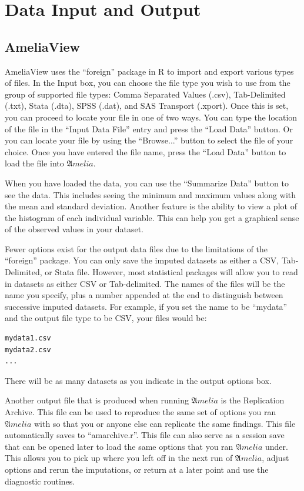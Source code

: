 \documentclass[12pt,titlepage]{article}
\begin{document}
\section{Data Input and Output}
\label{sec:data}


\subsection{AmeliaView}
\label{sec:data-gui}
AmeliaView uses the ``foreign'' package in R to import and export various types of files.  In the Input box, you can choose the file type you wish to use from the group of supported file types: Comma Separated Values (.csv), Tab-Delimited (.txt), Stata (.dta), SPSS (.dat), and SAS Transport (.xport). Once this is set, you can proceed to locate your file in one of two ways.  You can type the location of the file in the ``Input Data File'' entry and press the ``Load Data'' button.  Or you can locate your file by using the ``Browse...'' button to select the file of your choice.  Once you have entered the file name, press the ``Load Data'' button to load the file into ${\mathfrak Amelia}$.  

When you have loaded the data, you can use the ``Summarize Data'' button to see the data.  This includes seeing the minimum and maximum values along with the mean and standard deviation.  Another feature is the ability to view a plot of the histogram of each individual variable.  This can help you get a graphical sense of the observed values in your dataset.

Fewer options exist for the output data files due to the limitations of the ``foreign'' package.  You can only save the imputed datasets as either a CSV, Tab-Delimited, or Stata file. However, most statistical packages will allow you to read in datasets as either CSV or Tab-delimited.  The names of the files will be the name you specify, plus a number appended at the end to distinguish between successive imputed datasets.  For example, if you set the name to be ``mydata'' and the output file type to be CSV, your files would be:
\begin{verbatim}
mydata1.csv
mydata2.csv
...
\end{verbatim}
There will be as many datasets as you indicate in the output options box.  

Another output file that is produced when running ${\mathfrak Amelia}$ is the Replication Archive.  This file can be used to reproduce the same set of options you ran ${\mathfrak Amelia}$ with so that you or anyone else can replicate the same findings.  This file automatically saves to ``amarchive.r''. This file can also serve as a session save that can be opened later to load the same options that you ran ${\mathfrak Amelia}$ under.  This allows you to pick up where you left off in the next run of ${\mathfrak Amelia}$, adjust options and rerun the imputations, or return at a later point and use the diagnostic routines.  
\end{document}
